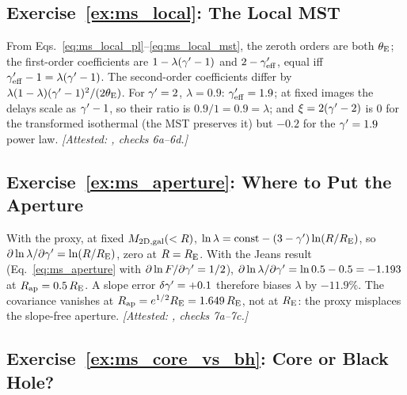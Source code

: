 \subsection*{Exercise~\ref{ex:ms_local}: The Local MST}

From Eqs.~\eqref{eq:ms_local_pl}--\eqref{eq:ms_local_mst}, the zeroth orders
are both $\theta_{\mathrm{E}}$; the first-order coefficients are $1-\lambda(\gamma'-1)$ and
$2-\gamma'_{\rm eff}$, equal iff $\gamma'_{\rm eff}-1=\lambda(\gamma'-1)$.  The second-order
coefficients differ by $\lambda(1-\lambda)(\gamma'-1)^2/(2\theta_{\mathrm{E}})$.  For $\gamma'=2$,
$\lambda=0.9$: $\gamma'_{\rm eff}=1.9$; at fixed images the delays scale as
$\gamma'-1$, so their ratio is $0.9/1=0.9=\lambda$; and $\xi=2(\gamma'-2)$ is $0$ for
the transformed isothermal (the MST preserves it) but $-0.2$ for the
$\gamma'=1.9$ power law.
\emph{[Attested: , checks 6a--6d.]}

\subsection*{Exercise~\ref{ex:ms_aperture}: Where to Put the Aperture}

With the proxy, at fixed $M_{\rm 2D,gal}(<R)$, $\ln\lambda=\text{const}-(3-\gamma')\ln(R/R_{\rm E})$,
so $\partial\ln\lambda/\partial\gamma'=\ln(R/R_{\rm E})$, zero at $R=R_{\rm E}$.
With the Jeans result (Eq.~\ref{eq:ms_aperture} with $\partial\ln F/\partial\gamma'=1/2$),
$\partial\ln\lambda/\partial\gamma'=\ln0.5-0.5=-1.193$ at $R_{\rm ap}=0.5\,R_{\rm E}$.
A slope error $\delta\gamma'=+0.1$ therefore biases $\lambda$ by $-11.9\%$.  The
covariance vanishes at $R_{\rm ap}=e^{1/2}R_{\rm E}=1.649\,R_{\rm E}$, not at
$R_{\rm E}$: the proxy misplaces the slope-free aperture.
\emph{[Attested: , checks 7a--7c.]}

\subsection*{Exercise~\ref{ex:ms_core_vs_bh}: Core or Black Hole?}

